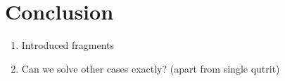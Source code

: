 \section{Conclusion}
\label{sec:conc}

\begin{enumerate}
    \item Introduced fragments
    \item Can we solve other cases exactly? (apart from single qutrit)
\end{enumerate}